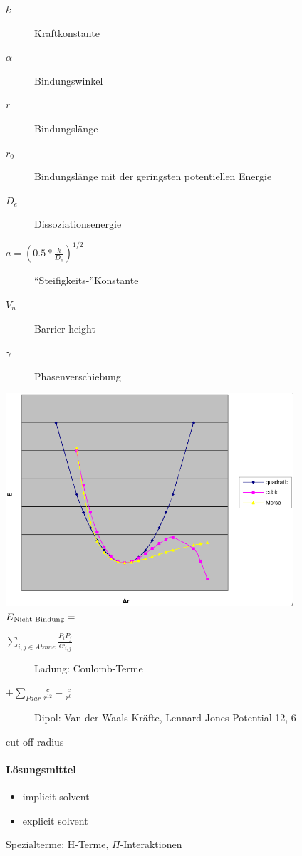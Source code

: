 \begin{description}
  \item [$k$] Kraftkonstante
  \item [$\alpha$] Bindungswinkel
  \item [$r$] Bindungslänge
  \item [$r_0$] Bindungslänge mit der geringsten potentiellen Energie
  \item [$D_e$] Dissoziationsenergie
  \item [$a = (0.5 * \frac{k}{D_e})^{1/2}$] ``Steifigkeits-''Konstante
  \item [$V_n$] Barrier height
  \item [$\gamma$] Phasenverschiebung
\end{description}

\includegraphics[width=0.8\textwidth]{lectures/160606/pix/potential_function.png}\\

$E\textsubscript{Nicht-Bindung} = $
\begin{description}
 \item [$\sum\nolimits_{i,j \in Atome} \frac{P_i P_j}{\epsilon r_{i,j}}$] Ladung: Coulomb-Terme
 \item [$+ \sum_{Paar} \frac{c}{r^{12}} - \frac{c}{r^6}$] Dipol: Van-der-Waals-Kräfte, Lennard-Jones-Potential 12, 6
\end{description}

cut-off-radius

\paragraph{Lösungsmittel}
\begin{itemize}
 \item implicit solvent
 \item explicit solvent
\end{itemize}
Spezialterme: H-Terme, $\Pi$-Interaktionen
